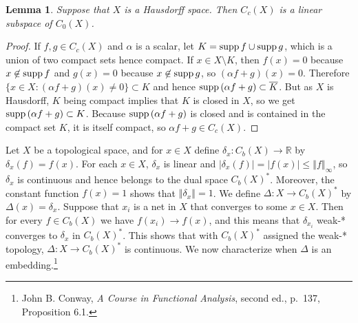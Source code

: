 \documentclass{article}
\newcommand{\supp}{\ensuremath\mathrm{supp}\,}
\newcommand{\norm}[1]{\left\Vert #1 \right\Vert}
\newtheorem{lemma}[theorem]{Lemma}
\theoremstyle{definition}
\begin{document}
\begin{lemma}
Suppose that $X$ is a Hausdorff space. Then $C_c(X)$ is a linear subspace of  $C_0(X)$.
\end{lemma}
\begin{proof}
If $f,g \in C_c(X)$ and $\alpha$ is a scalar, let $K=\supp f \cup \supp g$, which is a union of two compact sets hence compact.
If $x \in X \setminus K$, then $f(x)=0$ because $x \not \in \supp f$ and $g(x)=0$ because $x \not \in \supp g$, so
$(\alpha f+g)(x)=0$. Therefore $\{x \in X: (\alpha f+g)(x) \neq 0\} \subset K$ and hence
$\supp(\alpha f+g)  \subset \overline{K}$.
But as $X$ is Hausdorff, $K$ being compact implies that
$K$ is closed in $X$, so we get $\supp(\alpha f+g) \subset K$. Because $\supp(\alpha f+g)$ is closed and is contained
in the compact set $K$, it is itself compact, so $\alpha f+g \in C_c(X)$.
\end{proof}




Let $X$ be a topological space, and for  $x \in X$ define $\delta_x:C_b(X) \to \mathbb{R}$ by
$\delta_x(f) = f(x)$. For each $x \in X$, $\delta_x$ is linear and $|\delta_x(f)|  = |f(x)| \leq \norm{f}_\infty$, so $\delta_x$
is continuous and hence belongs to the dual space $C_b(X)^*$. Moreover, 
the constant function $f(x)=1$ shows that $\norm{\delta_x}=1$. We define $\Delta:X \to C_b(X)^*$ by
$\Delta(x)=\delta_x$. Suppose that $x_i$ is a net in $X$ that converges to some $x \in X$. Then
for every $f \in C_b(X)$ we have $f(x_i) \to f(x)$, and this means that $\delta_{x_i}$ weak-* converges
to $\delta_x$ in $C_b(X)^*$. This shows that with $C_b(X)^*$ assigned the weak-* topology,
$\Delta:X \to C_b(X)^*$ is continuous. We now characterize when $\Delta$ is an embedding.\footnote{John B. Conway,
{\em A Course in Functional Analysis}, second ed., p.~137, Proposition 6.1.}
\end{document}
